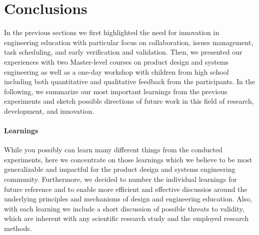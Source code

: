 \documentclass{PDS}
\begin{document}
\section{Conclusions}
\label{sec:conclusion}

In the previous sections we first highlighted the need for innovation in engineering education with particular focus on collaboration, issues management, task scheduling, and early verification and validation.
Then, we presented our experiences with two Master-level courses on product design and systems engineering as well as a one-day workshop with children from high school including both quantitative and qualitative feedback from the participants.
In the following, we summarize our most important learnings from the previous experiments and sketch possible directions of future work in this field of research, development, and innovation.

\paragraph{Learnings}

While you possibly can learn many different things from the conducted experiments, here we concentrate on those learnings which we believe to be most generalizable and impactful for the product design and systems engineering community.
Furthermore, we decided to number the individual learnings for future reference and to enable more efficient and effective discussios around the underlying principles and mechanisms of design and engineering education.
Also, with each learning we include a short discussion of possible threats to validity, which are inherent with any scientific research study and the employed research methods.
\end{document}
